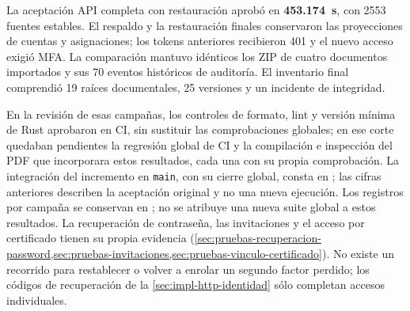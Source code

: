 La aceptación API completa con restauración aprobó en \textbf{453.174~s}, con 2553 fuentes estables. El respaldo y la restauración finales conservaron las proyecciones de cuentas y asignaciones; los tokens anteriores recibieron 401 y el nuevo acceso exigió MFA. La comparación mantuvo idénticos los ZIP de cuatro documentos importados y sus 70 eventos históricos de auditoría. El inventario final comprendió 19 raíces documentales, 25 versiones y un incidente de integridad.

En la revisión de esas campañas, los controles de formato, lint y versión mínima de Rust aprobaron en CI, sin sustituir las comprobaciones globales; en ese corte quedaban pendientes la regresión global de CI y la compilación e inspección del PDF que incorporara estos resultados, cada una con su propia comprobación. La integración del incremento en \texttt{main}, con su cierre global, consta en ; las cifras anteriores describen la aceptación original y no una nueva ejecución. Los registros por campaña se conservan en ; no se atribuye una nueva suite global a estos resultados. La recuperación de contraseña, las invitaciones y el acceso por certificado tienen su propia evidencia (\cref{sec:pruebas-recuperacion-password,sec:pruebas-invitaciones,sec:pruebas-vinculo-certificado}). No existe un recorrido para restablecer o volver a enrolar un segundo factor perdido; los códigos de recuperación de la \cref{sec:impl-http-identidad} sólo completan accesos individuales.
